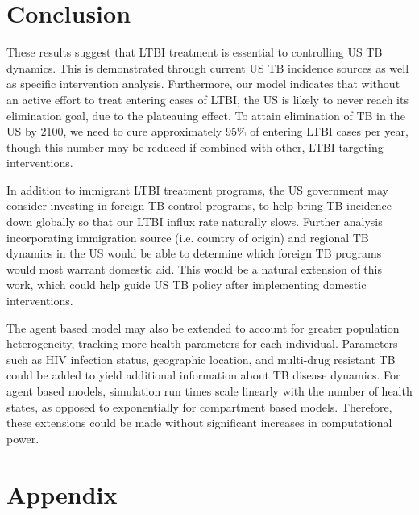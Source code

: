 \documentclass{amsart}
\renewcommand{\(}{\left(}
\renewcommand{\)}{\right)}
\begin{document}
\section{Conclusion}
These results suggest that  LTBI treatment is essential to
controlling US TB dynamics. This is demonstrated through current US TB incidence
sources as well as specific intervention analysis. 
Furthermore, our model indicates that without an active effort to treat
entering cases of LTBI, the US is likely to never reach its elimination goal, due to the plateauing
effect. To attain elimination of TB in the US by 2100, we need to cure approximately
95\% of entering LTBI cases per year, though this number may be reduced if
combined with other, LTBI targeting interventions. 

In addition to immigrant LTBI treatment programs, the US government may consider
investing in foreign TB control programs, to help bring TB incidence down
globally so that our LTBI influx rate naturally slows. Further analysis
incorporating immigration source (i.e. country of origin) and regional TB
dynamics in the US would be able to determine which foreign TB programs would
most warrant domestic aid. This would be a natural extension of this work,
which could help guide US TB policy after implementing domestic interventions.  

The agent based model may also be extended to account for greater population
heterogeneity, tracking more health parameters for each individual.
Parameters such as HIV infection status, geographic location, and multi-drug
resistant TB could be added to yield additional information about TB disease dynamics.
For agent based models, simulation run times scale linearly with the number of health
states, as opposed to exponentially for compartment based models. Therefore,
these extensions could be made without significant increases in computational power.

\section{Appendix} 
\end{document}
